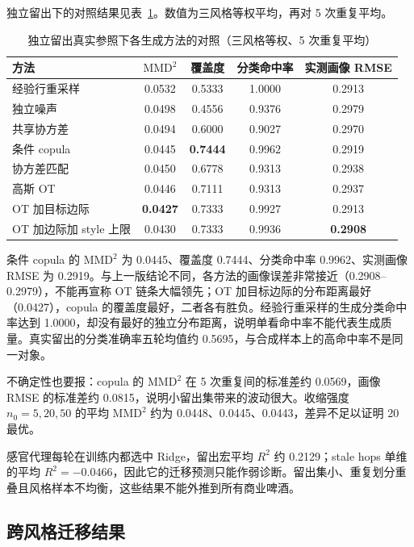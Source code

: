 \documentclass[UTF8,a4paper,zihao=-4]{ctexart}
\numberwithin{figure}{section}
\numberwithin{table}{section}
\numberwithin{equation}{section}
\begin{document}
独立留出下的对照结果见表~\ref{tab:q3-res}。数值为三风格等权平均，再对 5 次重复平均。

\begin{table}[H]
  \centering
  \caption{独立留出真实参照下各生成方法的对照（三风格等权、5 次重复平均）}
  \label{tab:q3-res}
  \small
  \begin{tabularx}{\textwidth}{@{}>{\raggedright\arraybackslash}X c c c c@{}}
    \toprule
    方法 & $\mathrm{MMD}^{2}$ & 覆盖度 & 分类命中率 & 实测画像 RMSE \\
    \midrule
    经验行重采样 & 0.0532 & 0.5333 & 1.0000 & 0.2913 \\
    独立噪声 & 0.0498 & 0.4556 & 0.9376 & 0.2979 \\
    共享协方差 & 0.0494 & 0.6000 & 0.9027 & 0.2970 \\
    条件 copula & 0.0445 & \textbf{0.7444} & 0.9962 & 0.2919 \\
    协方差匹配 & 0.0450 & 0.6778 & 0.9313 & 0.2938 \\
    高斯 OT & 0.0446 & 0.7111 & 0.9313 & 0.2937 \\
    OT 加目标边际 & \textbf{0.0427} & 0.7333 & 0.9927 & 0.2913 \\
    OT 加边际加 style 上限 & 0.0430 & 0.7333 & 0.9936 & \textbf{0.2908} \\
    \bottomrule
  \end{tabularx}
\end{table}

条件 copula 的 $\mathrm{MMD}^{2}$ 为 0.0445、覆盖度 0.7444、分类命中率 0.9962、实测画像 RMSE 为 0.2919。与上一版结论不同，各方法的画像误差非常接近（0.2908--0.2979），不能再宣称 OT 链条大幅领先；OT 加目标边际的分布距离最好（0.0427），copula 的覆盖度最好，二者各有胜负。经验行重采样的生成分类命中率达到 1.0000，却没有最好的独立分布距离，说明单看命中率不能代表生成质量。真实留出的分类准确率五轮均值约 0.5695，与合成样本上的高命中率不是同一对象。

不确定性也要报：copula 的 $\mathrm{MMD}^{2}$ 在 5 次重复间的标准差约 0.0569，画像 RMSE 的标准差约 0.0815，说明小留出集带来的波动很大。收缩强度 $n_0=5,20,50$ 的平均 $\mathrm{MMD}^{2}$ 约为 0.0448、0.0445、0.0443，差异不足以证明 20 最优。

感官代理每轮在训练内都选中 Ridge，留出宏平均 $R^2$ 约 0.2129；stale hops 单维的平均 $R^2=-0.0466$，因此它的迁移预测只能作弱诊断。留出集小、重复划分重叠且风格样本不均衡，这些结果不能外推到所有商业啤酒。

\subsection{跨风格迁移结果}
\end{document}
